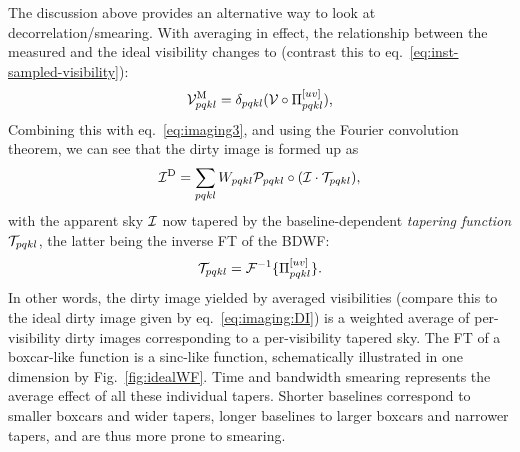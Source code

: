 \documentclass[useAMS,usenatbib]{mn2e}
\begin{document}
The discussion above provides an alternative way to look at decorrelation/smearing. With averaging in effect, the relationship between the measured and the ideal visibility changes to (contrast this to eq.~\ref{eq:inst-sampled-visibility}): 
\begin{equation}
\mathcal{V}^\mathrm{M}_{pqkl} = \delta_{pqkl} ( \mathcal{V}\circ\Pi^{[uv]}_{pqkl} ),
\end{equation} 
Combining this with eq.~\ref{eq:imaging3}, and using the Fourier convolution theorem, we can see that the dirty image is formed up as
\begin{equation}
\mathcal{I}^\mathrm{D} =  \sum_{pqkl} W_{pqkl} \mathcal{P}_{pqkl} \circ (\mathcal{I}\cdot\mathcal{T}_{pqkl}),
\end{equation}
with the apparent sky $\mathcal{I}$ now tapered by the baseline-dependent \emph{tapering function} $\mathcal{T}_{pqkl}$, the latter being the inverse FT of the BDWF:
\begin{equation}
\mathcal{T}_{pqkl} = \mathcal{F}^{-1}\{ \Pi^{[uv]}_{pqkl} \}.
\end{equation}
In other words, the dirty image yielded by averaged visibilities 
(compare this to the ideal dirty image given by eq.~\ref{eq:imaging:DI})
is a weighted average of per-visibility dirty images corresponding to a per-visibility tapered sky. The FT of a boxcar-like function is a sinc-like function, schematically illustrated in one dimension by Fig.~\ref{fig:idealWF}. Time and bandwidth smearing represents the average effect 
of all these individual tapers. Shorter baselines correspond to smaller boxcars and wider tapers, longer baselines to larger 
boxcars and narrower tapers, and are thus more prone to smearing.
\end{document}
